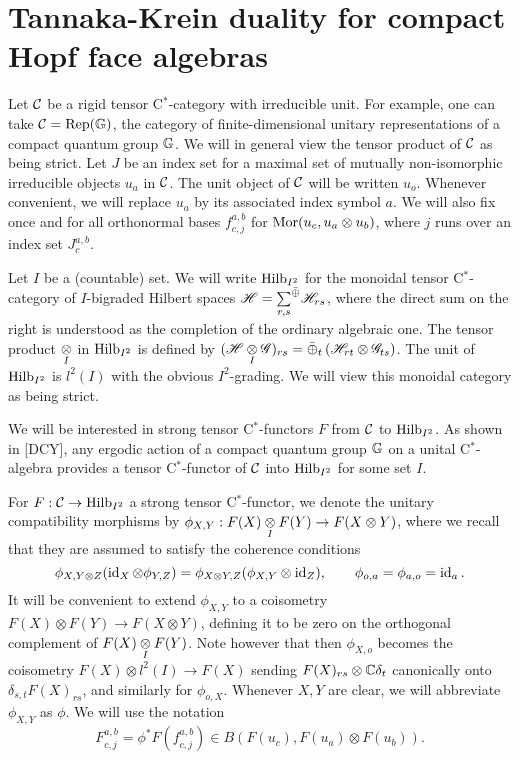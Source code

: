 \section{Tannaka-Krein duality for compact Hopf face algebras}

Let $\mathcal{C}$ be a rigid tensor C$^*$-category with irreducible unit. For example, one can take $\mathcal{C} = \mathrm{Rep}(\mathbb{G})$, the category of finite-dimensional unitary representations of a compact quantum group $\mathbb{G}$. We will in general view the tensor product of $\mathcal{C}$ as being strict. Let $J$ be an index set for a maximal set of mutually non-isomorphic irreducible objects $u_a$ in $\mathcal{C}$. The unit object of $\mathcal{C}$ will be written $u_o$. Whenever convenient, we will replace $u_a$ by its associated index symbol $a$. We will also fix once and for all orthonormal bases $f_{c,j}^{a,b}$ for $\mathrm{Mor}(u_c,u_a\otimes u_b)$, where $j$ runs over an index set $J^{a,b}_{c}$.

Let $I$ be a (countable) set. We will write $\mathrm{Hilb}_{I^2}$ for the monoidal tensor C$^*$-category of $I$-bigraded Hilbert spaces $\mathscr{H} = \underset{r,s}{\sum}^{\bar{\oplus}}\mathscr{H}_{rs}$, where the direct sum on the right is understood as the completion of the ordinary algebraic one. The tensor product $\underset{I}{\otimes}$ in $\mathrm{Hilb}_{I^2}$ is defined by $(\mathscr{H}\underset{I}{\otimes} \mathscr{G})_{rs} = \bar{\oplus}_t \left(\mathscr{H}_{rt}\otimes\mathscr{G}_{ts}\right)$. The unit of $\mathrm{Hilb}_{I^2}$ is $l^2(I)$ with the obvious $I^2$-grading. We will view this monoidal category as being strict.

We will be interested in strong tensor C$^*$-functors $F$ from $\mathcal{C}$ to $\mathrm{Hilb}_{I^2}$. As shown in [DCY], any ergodic action of a compact quantum group $\mathbb{G}$ on a unital C$^*$-algebra provides a tensor C$^*$-functor of $\mathcal{C}$ into $\mathrm{Hilb}_{I^2}$ for some set $I$.

For $F: \mathcal{C}\rightarrow \mathrm{Hilb}_{I^2}$ a strong tensor C$^*$-functor, we denote the unitary compatibility morphisms by $\phi_{X,Y}:F(X)\underset{I}{\otimes} F(Y)\rightarrow F(X\otimes Y)$, where we recall that they are assumed to satisfy the coherence conditions  \[\phi_{X,Y\otimes Z}(\operatorname{id}_X\otimes \phi_{Y,Z}) = \phi_{X\otimes Y,Z}(\phi_{X,Y}\otimes \operatorname{id}_Z),\qquad \phi_{o,a} = \phi_{a,o} = \operatorname{id}_a.\] It will be convenient to extend $\phi_{X,Y}$ to a coisometry $F(X)\otimes F(Y)\rightarrow F(X\otimes Y)$, defining it to be zero on the orthogonal complement of $F(X)\underset{I}{\otimes} F(Y)$. Note however that then $\phi_{X,o}$ becomes the coisometry $F(X)\otimes l^2(I)\rightarrow F(X)$ sending $F(X)_{rs} \otimes \mathbb{C}\delta_t$ canonically onto $\delta_{s,t}F(X)_{rs}$, and similarly for $\phi_{o,X}$. Whenever $X,Y$ are clear, we will abbreviate $\phi_{X,Y}$ as $\phi$. We will use the notation \[F^{a,b}_{c,j} = \phi^* F(f^{a,b}_{c,j}) \in B(F(u_c),F(u_a)\otimes F(u_b)).\]

